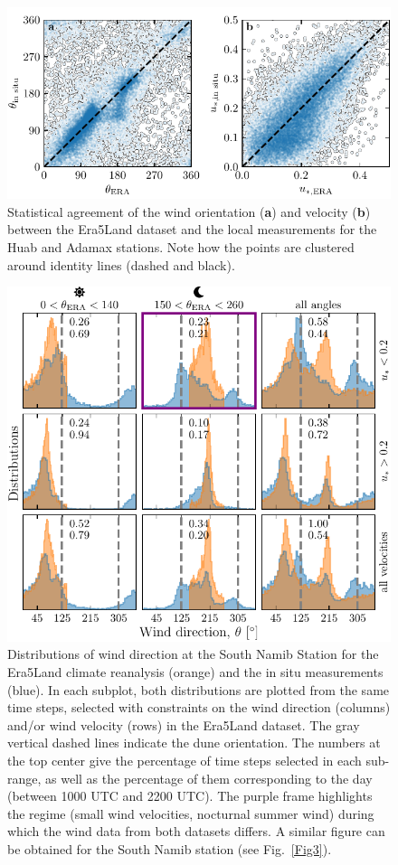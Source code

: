 \begin{figure}
  \centering
  \includegraphics[scale=1]{Figures/Figure5_supp.pdf}
  \caption{Statistical agreement of the wind orientation (\textbf{a}) and velocity (\textbf{b}) between the Era5Land dataset and the local measurements for the Huab and Adamax stations. Note how the points are clustered around identity lines (dashed and black).}
  \label{Fig5_supp}
\end{figure}

\begin{figure}
  \centering
  \includegraphics[scale=1]{Figures/Figure6_supp.pdf}
  \caption{Distributions of wind direction at the South Namib Station for the Era5Land climate reanalysis (orange) and the in situ measurements (blue). In each subplot, both distributions are plotted from the same time steps, selected with constraints on the wind direction (columns) and/or wind velocity (rows) in the Era5Land dataset. The gray vertical dashed lines indicate the dune orientation. The numbers at the top center give the percentage of time steps selected in each sub-range, as well as the percentage of them corresponding to the day (between 1000 UTC and 2200 UTC). The purple frame highlights the regime (small wind velocities, nocturnal summer wind) during which the wind data from both datasets differs. A similar figure can be obtained for the South Namib station (see Fig.~\ref{Fig3}).}
  \label{Fig6_supp}
\end{figure}

